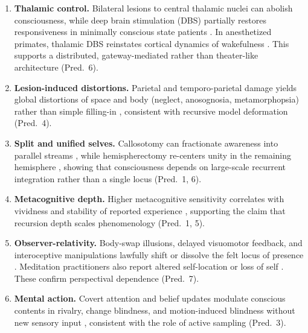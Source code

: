 \documentclass[12pt]{article}
\begin{document}
\begin{enumerate}
\item \textbf{Thalamic control.} Bilateral lesions to central thalamic nuclei can abolish consciousness, while deep 
brain stimulation (DBS) partially restores responsiveness in minimally conscious state patients \parencite{schiff2007_behavioural}. 
In anesthetized primates, thalamic DBS reinstates cortical dynamics of wakefulness \parencite{redinbaugh2020_thalamus}. 
This supports a distributed, gateway-mediated rather than theater-like architecture (Pred.\ 6).

\item \textbf{Lesion-induced distortions.} Parietal and temporo-parietal damage yields global distortions of space and body 
(neglect, anosognosia, metamorphopsia) rather than simple filling-in \parencite{venkatesan2015_anosognosia,baier2007_somatoparaphrenia}, 
consistent with recursive model deformation (Pred.\ 4).

\item \textbf{Split and unified selves.} Callosotomy can fractionate awareness into parallel streams \parencite{gazzaniga2005_forty}, 
while hemispherectomy re-centers unity in the remaining hemisphere \parencite{li2020_hemispherectomy}, showing that consciousness depends 
on large-scale recurrent integration rather than a single locus (Pred.\ 1, 6).

\item \textbf{Metacognitive depth.} Higher metacognitive sensitivity correlates with vividness and stability of reported 
experience \parencite{fleming2014_how,morales2018_domain}, supporting the claim that recursion depth scales phenomenology (Pred.\ 1, 5).

\item \textbf{Observer-relativity.} Body-swap illusions, delayed visuomotor feedback, and interoceptive manipulations lawfully shift or 
dissolve the felt locus of presence \parencite{ehrsson2004_rubber,blanke2012_multisensory}. 
Meditation practitioners also report altered self-location or loss of self \parencite{milliere2018psychedelics,lindahl2019varieties}.
These confirm perspectival dependence (Pred.\ 7).

\item \textbf{Mental action.} Covert attention and belief updates modulate conscious contents in rivalry, change blindness, and 
motion-induced blindness without new sensory input \parencite{frassle2014_binocular,koch2016_neural}, consistent with the role of active sampling (Pred.\ 3).
\end{enumerate}
\end{document}
